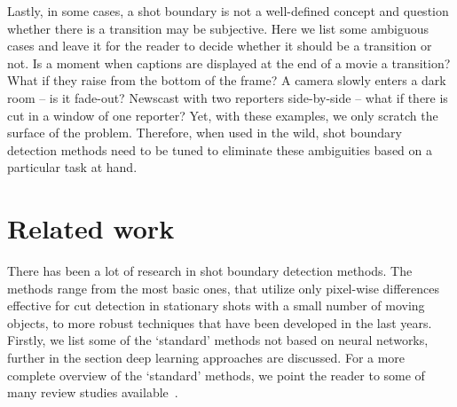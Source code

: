 Lastly, in some cases, a shot boundary is not a well-defined concept and question whether there is a transition may be subjective. Here we list some ambiguous cases and leave it for the reader to decide whether it should be a transition or not. Is a moment when captions are displayed at the end of a movie a transition? What if they raise from the bottom of the frame? A camera slowly enters a dark room -- is it fade-out? Newscast with two reporters side-by-side -- what if there is cut in a window of one reporter? Yet, with these examples, we only scratch the surface of the problem. Therefore, when used in the wild, shot boundary detection methods need to be tuned to eliminate these ambiguities based on a particular task at hand. %





\section{Related work}

There has been a lot of research in shot boundary detection methods. The methods range from the most basic ones, that utilize only pixel-wise differences \cite{zhang93} effective for cut detection in stationary shots with a small number of moving objects, to more robust techniques that have been developed in the last years. Firstly, we list some of the `standard' methods not based on neural networks, further in the section deep learning approaches are discussed. For a more complete overview of the `standard' methods, we point the reader to some of many review studies available~\cite{MethodsandChallengesinSBD}.

